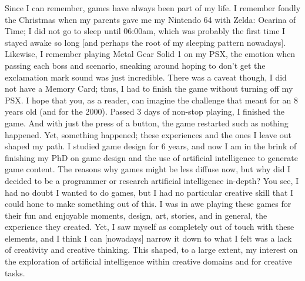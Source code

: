 

Since I can remember, games have always been part of my life. I remember fondly the Christmas when my parents gave me my Nintendo 64 with Zelda: Ocarina of Time; I did not go to sleep until 06:00am, which was probably the first time I stayed awake so long [and perhaps the root of my sleeping pattern nowadays]. Likewise, I remember playing Metal Gear Solid 1 on my PSX, the emotion when passing each boss and scenario, sneaking around hoping to don't get the exclamation mark sound was just incredible. There was a caveat though, I did not have a Memory Card; thus, I had to finish the game without turning off my PSX. I hope that you, as a reader, can imagine the challenge that meant for an 8 years old (and for the 2000). Passed 3 days of non-stop playing, I finished the game. And with just the press of a button, the game restarted such as nothing happened. Yet, something happened; these experiences and the ones I leave out shaped my path. I studied game design for 6 years, and now I am in the brink of finishing my PhD on game design and the use of artificial intelligence to generate game content. The reasons why games might be less diffuse now, but why did I decided to be a programmer or research artificial intelligence in-depth? You see, I had no doubt I wanted to do games, but I had no particular creative skill that I could hone to make something out of this. I was in awe playing these games for their fun and enjoyable moments, design, art, stories, and in general, the experience they created. Yet, I saw myself as completely out of touch with these elements, and I think I can [nowadays] narrow it down to what I felt was a lack of creativity and creative thinking. This shaped, to a large extent, my interest on the exploration of artificial intelligence within creative domains and for creative tasks.

